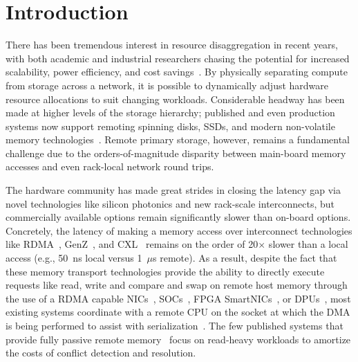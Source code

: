 \section{Introduction}

There has been tremendous interest in resource disaggregation in
recent years, with both academic and industrial researchers chasing
the potential for increased scalability, power efficiency, and cost
savings~\cite{fastswap,rethinking,the-machine,requirements,clio-arxiv,firebox,leap,zombieland,storm,aifm,legoos,supernic}.
By physically separating compute from storage across a network, it is
possible to dynamically adjust hardware resource allocations to suit
changing workloads.  Considerable headway has been made at higher
levels of the storage hierarchy; published and even production systems
now support remoting spinning disks, SSDs, and modern non-volatile
memory technologies~\cite{decible}.  Remote primary storage, however,
remains a fundamental challenge due to the orders-of-magnitude
disparity between main-board memory accesses and even rack-local
network round trips.



The hardware community has made great strides in closing the latency
gap via novel technologies like silicon photonics and new rack-scale
interconnects, but commercially available options remain significantly
slower than on-board options.  Concretely, the latency of making a
memory access over interconnect technologies
like RDMA~\cite{infiniband-spec}, GenZ~\cite{genz}, and CXL~\cite{cxl}
remains on the order of 20$\times$ slower than a local access (e.g.,
50~ns local versus 1~$\mu$s remote).  As a result, despite the fact
that these memory transport technologies provide the ability to
directly execute requests like read, write and compare and swap on
remote host memory through the use of a RDMA capable
NICs~\cite{connectx}, SOCs~\cite{cavium}, FPGA
SmartNICs~\cite{corundum,kv-direct}, or DPUs~\cite{fungible}, most
existing systems coordinate with a remote CPU on the socket at which
the DMA is being performed to assist with
serialization~\cite{cliquemap,erpc,herd,sonuma,storm}.  The few
published systems that provide fully passive remote
memory~\cite{reigons,clover} focus on read-heavy workloads to
amortize the costs of conflict detection and resolution.

